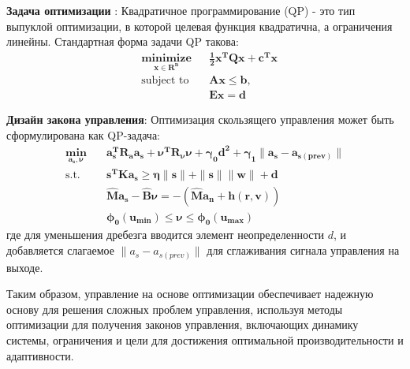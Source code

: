     \textbf{Задача оптимизации} : Квадратичное программирование (QP) - это тип выпуклой оптимизации, в которой целевая функция квадратична, а ограничения линейны.
    Стандартная форма задачи QP такова:
    \begin{equation*}
        \begin{aligned}
            & \mathbf{\underset{x \in R^n}{\text{minimize}}}
            & & \mathbf{\frac{1}{2} x^T Q x + c^T x} \\
            & \text{subject to}
            & & \mathbf{A x \leq b}, \\
            & & & \mathbf{E x = d}
        \end{aligned}
    \end{equation*}

    \textbf{Дизайн закона управления}: Оптимизация скользящего управления может быть сформулирована как QP-задача:
    \begin{equation*}
    \begin{aligned}
    \mathbf{\min_{a_s, \boldsymbol{\nu}}} \quad & \mathbf{a_s^T R_a a_s  + \boldsymbol{\nu}^T R_{\boldsymbol{\nu}} \boldsymbol{\nu} +
    \gamma_0 d^2 + \gamma_1 \|a_s - a_{s (prev)}\|} \\
    \textrm{s.t.} \quad & \mathbf{s^TKa_s \geq \boldsymbol{\eta} \|s\| + \|s\|\|w\| + d} \\\
    & \mathbf{\hat Ma_s - \hat B\boldsymbol{\nu} = -(\hat{M}a_n + h(r, v))} \\
    & \mathbf{\boldsymbol{\phi}_0(u_{min}) \leq \boldsymbol{\nu} \leq \boldsymbol{\phi}_0(u_{max})}
    \end{aligned}
    \end{equation*}
    где для уменьшения дребезга вводится элемент неопределенности $d$,
    и добавляется слагаемое $\|a_s - a_{s (prev)}\| $ для сглаживания сигнала управления на выходе.

    Таким образом, управление на основе оптимизации обеспечивает надежную основу для решения сложных проблем управления, используя методы оптимизации для получения законов управления, включающих динамику системы, ограничения и цели для достижения оптимальной производительности и адаптивности.